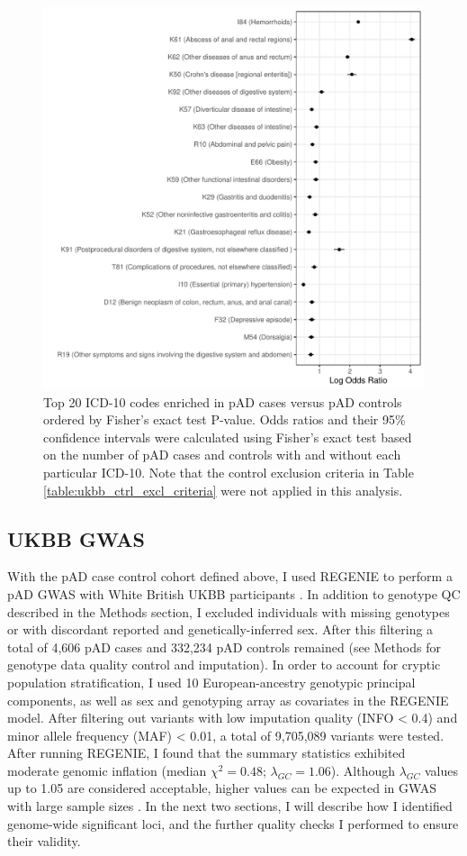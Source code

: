 \begin{figure}[H] 
  \centering    
  \includegraphics[width=1.0\textwidth]{pheno_enrich}
  \caption[Figure]{Top 20 ICD-10 codes enriched in pAD cases versus pAD controls ordered by Fisher's exact test P-value. Odds ratios and their 95\% confidence intervals were calculated using Fisher's exact test based on the number of pAD cases and controls with and without each particular ICD-10. Note that the control exclusion criteria in Table \ref{table:ukbb_ctrl_excl_criteria} were not applied in this analysis.}
  \label{fig:pheno_enrich}
  \end{figure}


  \subsection{UKBB GWAS}
  With the pAD case control cohort defined above, I used REGENIE to perform a pAD GWAS with White British UKBB participants \cite{Mbatchou2021-qm}. In addition to genotype QC described in the Methods section, I  excluded individuals with missing genotypes or with discordant reported and genetically-inferred sex. After this filtering a total of 4,606 pAD cases and 332,234 pAD controls remained (see Methods for genotype data quality control and imputation). In order to account for cryptic population stratification, I used 10 European-ancestry genotypic principal components, as well as sex and genotyping array as covariates in the REGENIE model. After filtering out variants with low imputation quality (INFO < 0.4) and minor allele frequency (MAF) < 0.01, a total of 9,705,089 variants were tested. After running REGENIE, I found that the summary statistics exhibited moderate genomic inflation (median $\chi^{2}=0.48$; $\lambda_{GC}=1.06$). Although $\lambda_{GC}$ values up to 1.05 are considered acceptable, higher values can be expected in GWAS with large sample sizes \cite{Price2010-zb}. In the next two sections, I will describe how I identified genome-wide significant loci, and the further quality checks I performed to ensure their validity. 
  
